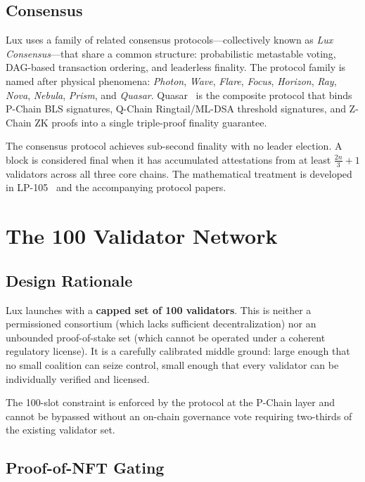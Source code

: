 \documentclass[11pt,a4paper]{article}
\begin{document}
\subsection{Consensus}

Lux uses a family of related consensus protocols---collectively known
as \emph{Lux Consensus}---that share a common structure: probabilistic
metastable voting, DAG-based transaction ordering, and leaderless
finality. The protocol family is named after physical phenomena:
\emph{Photon}, \emph{Wave}, \emph{Flare}, \emph{Focus}, \emph{Horizon},
\emph{Ray}, \emph{Nova}, \emph{Nebula}, \emph{Prism}, and
\emph{Quasar}. Quasar~\cite{lp105} is the composite protocol that
binds P-Chain BLS signatures, Q-Chain Ringtail/ML-DSA threshold
signatures, and Z-Chain ZK proofs into a single triple-proof finality
guarantee.

The consensus protocol achieves sub-second finality with no leader
election. A block is considered final when it has accumulated
attestations from at least $\frac{2n}{3} + 1$ validators across all
three core chains. The mathematical treatment is developed in
LP-105~\cite{lp105} and the accompanying protocol papers.

\section{The 100 Validator Network}

\subsection{Design Rationale}

Lux launches with a \textbf{capped set of 100 validators}. This is
neither a permissioned consortium (which lacks sufficient
decentralization) nor an unbounded proof-of-stake set (which cannot
be operated under a coherent regulatory license). It is a carefully
calibrated middle ground: large enough that no small coalition can
seize control, small enough that every validator can be individually
verified and licensed.

The 100-slot constraint is enforced by the protocol at the P-Chain
layer and cannot be bypassed without an on-chain governance vote
requiring two-thirds of the existing validator set.

\subsection{Proof-of-NFT Gating}
\end{document}
